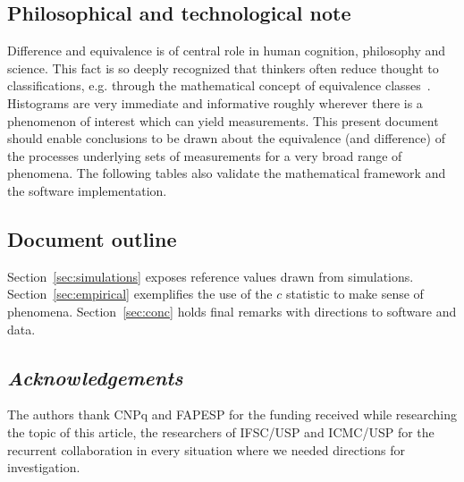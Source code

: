 \documentclass[12pt,fleqn]{article}
\begin{document}
\subsection{Philosophical and technological note}
Difference and equivalence is of central role in human cognition,
philosophy and science.
This fact is so deeply recognized that thinkers often reduce
thought to classifications, e.g. through the
mathematical concept of equivalence classes~\cite{deleuze}.
Histograms are very immediate and informative
roughly wherever there is a phenomenon of interest which can yield measurements.
This present document should enable conclusions to be drawn about 
the equivalence (and difference)
of the processes underlying sets of measurements for a very
broad range of phenomena.
The following tables 
also validate the mathematical framework
and the software implementation.

\subsection{Document outline}
Section~\ref{sec:simulations} exposes reference values drawn from simulations.
Section~\ref{sec:empirical} exemplifies the use of the $c$ statistic
to make sense of phenomena.
Section~\ref{sec:conc} holds final remarks with directions to
software and data.



\subsection*{\textit{Acknowledgements}}
The authors thank CNPq and FAPESP for the funding received while researching the topic of this article,
the researchers of IFSC/USP and ICMC/USP for the recurrent collaboration in every situation
where we needed directions for investigation.
\end{document}
